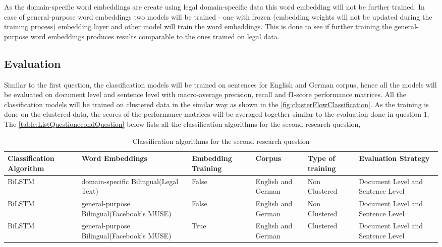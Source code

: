 As the domain-specific word embeddings are create using legal domain-specific data this word embedding will not be further trained. In case of general-purpose word embeddings two models will be trained - one with frozen (embedding weights will not be updated during the training process) embedding layer and other model will train the word embeddings. This is done to see if further training the general-purpose word embeddings produces results comparable to the ones trained on legal data.

\subsection*{Evaluation}

Similar to the first question, the classification models will be trained on sentences for English and German corpus, hence all the models will be evaluated on document level and sentence level with macro-average precision, recall and f1-score performance matrices. All the classification models will be trained on clustered data in the similar way as shown in the  \ref{fig:clusterFlowClassification}. As the training is done on the clustered data, the scores of the performance matrices will be averaged together similar to the evaluation done in question 1.
\clearpage
The \ref{table:ListQuestionecondQuestion} below lists all the classification algorithms for the second research question,
\begin{table}[!ht]
\begin{tabular}{>{\centering\arraybackslash}m{2cm}>{\centering\arraybackslash}m{2.9cm}>{\centering\arraybackslash}m{1.8cm}>{\centering\arraybackslash}m{2cm}>{\centering\arraybackslash}m{1.9cm}>{\centering\arraybackslash}m{2cm}}
\hline
\textbf{Classification Algorithm} & \textbf{Word Embeddings} & \textbf{Embedding Training} & \textbf{Corpus} & \textbf{Type of training} & \textbf{Evaluation Strategy} \\ \hline
\gls{BiLSTM} & domain-specific Bilingual(Legal Text) & False & English and German & Non Clustered & Document Level and Sentence Level \\
\gls{BiLSTM} & general-purpose Bilingual(Facebook's MUSE) & False & English and German & Non Clustered & Document Level and Sentence Level \\
\gls{BiLSTM} & general-purpose Bilingual(Facebook's MUSE) & True & English and German & Clustered & Document Level and Sentence Level \\ \hline
\end{tabular}
\caption{Classification algorithms for the second research question}
\label{table:ListQuestionSecondQuestion}
\end{table}


